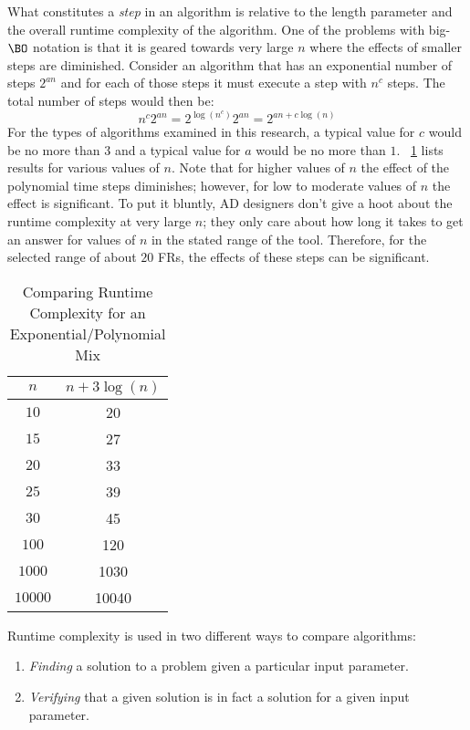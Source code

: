 What constitutes a \emph{step} in an algorithm is relative to the length parameter and the overall runtime
complexity of the algorithm.  One of the problems with big-\(\BO\) notation is that it is geared towards very large
\(n\) where the effects of smaller steps are diminished.  Consider an algorithm that has an exponential number of
steps \(2^{an}\) and for each of those steps it must execute a step with \(n^c\) steps.  The total number of steps
would then be:
\[n^c2^{an}=2^{\log(n^c)}2^{an}=2^{an+c\log(n)}\]
For the types of algorithms examined in this research, a typical value for \(c\) would be no more than \(3\) and a
typical value for \(a\) would be no more than \(1\).  \tablename~\ref{tab:grow} lists results for various values of
\(n\).  Note that for higher values of \(n\) the effect of the polynomial time steps diminishes; however, for low
to moderate values of \(n\) the effect is significant.  To put it bluntly, AD designers don't give a hoot about the
runtime complexity at very large \(n\); they only care about how long it takes to get an answer for values of \(n\)
in the stated range of the tool.  Therefore, for the selected range of about \(20\) FRs, the effects of these steps
can be significant.

\begin{table}[H]
  \setlength{\extrarowheight}{2ex}
  \centering
  \caption{Comparing Runtime Complexity for an Exponential/Polynomial Mix}
  \label{tab:grow}
  \begin{tabular}{|c|c|}
    \hline
    \(n\) & \(n+3\log(n)\) \\
    \hline
    \(10\) & 20 \\
    \hline
    \(15\) & 27 \\
    \hline
    \(20\) & 33 \\
    \hline
    \(25\) & 39 \\
    \hline
    \(30\) & 45 \\
    \hline
    \(100\) & 120 \\
    \hline
    \(1000\) & 1030 \\
    \hline
    \(10000\) & 10040 \\
    \hline
  \end{tabular}
\end{table}

Runtime complexity is used in two different ways to compare algorithms:
\begin{enumerate}
\item \emph{Finding} a solution to a problem given a particular input parameter.
\item \emph{Verifying} that a given solution is in fact a solution for a given input parameter.
\end{enumerate}

